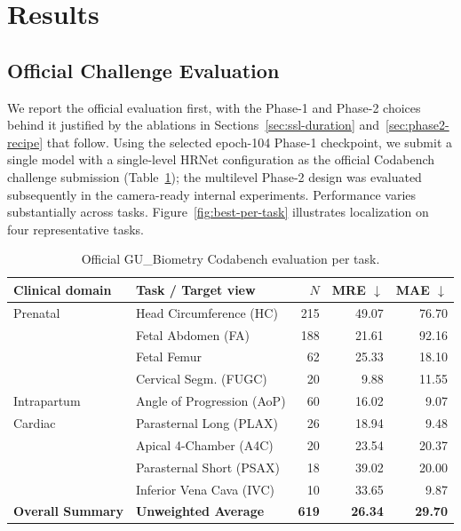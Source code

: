 \documentclass[runningheads]{llncs}
\begin{document}

\section{Results}


\subsection{Official Challenge Evaluation}
We report the official evaluation first, with the Phase-1 and Phase-2 choices behind it justified by the ablations in Sections~\ref{sec:ssl-duration} and~\ref{sec:phase2-recipe} that follow. Using the selected epoch-104 Phase-1 checkpoint, we submit a single model with a single-level HRNet configuration as the official Codabench challenge submission (Table~\ref{tab:codabench-results}); the multilevel Phase-2 design was evaluated subsequently in the camera-ready internal experiments. Performance varies substantially across tasks. Figure~\ref{fig:best-per-task} illustrates localization on four representative tasks.
\begin{table}[tb]
\caption{Official GU\_Biometry Codabench evaluation per task.}
\label{tab:codabench-results}
\centering
\begin{tabular}{llrrr}
\toprule
\textbf{Clinical domain} & \textbf{Task / Target view} & \textbf{$N$} & \textbf{MRE $\downarrow$} & \textbf{MAE $\downarrow$} \\
\midrule
Prenatal & Head Circumference (HC) & 215 & 49.07 & 76.70 \\
 & Fetal Abdomen (FA)      & 188 & 21.61 & 92.16 \\
 & Fetal Femur             & 62  & 25.33 & 18.10 \\
 & Cervical Segm. (FUGC)   & 20  & 9.88  & 11.55 \\
\midrule
Intrapartum & Angle of Progression (AoP) & 60 & 16.02 & 9.07 \\
\midrule
Cardiac & Parasternal Long (PLAX)  & 26 & 18.94 & 9.48 \\
 & Apical 4-Chamber (A4C)   & 20 & 23.54 & 20.37 \\
 & Parasternal Short (PSAX) & 18 & 39.02 & 20.00 \\
 & Inferior Vena Cava (IVC) & 10 & 33.65 & 9.87 \\
\midrule
\textbf{Overall Summary} & \textbf{Unweighted Average} & \textbf{619} & \textbf{26.34} & \textbf{29.70} \\
\bottomrule
\end{tabular}
\end{table}
\end{document}
